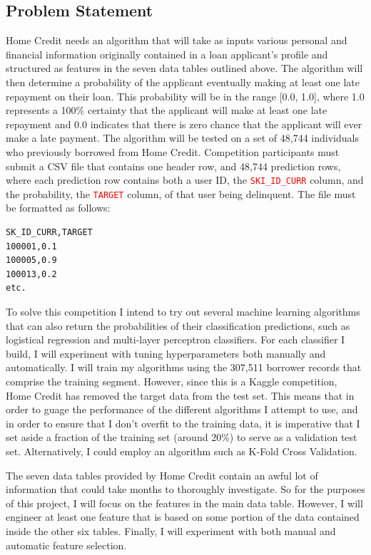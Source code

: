 \documentclass[12pt, letterpaper]{article}
\begin{document}
\subsection{Problem Statement}
Home Credit needs an algorithm that will take as inputs various personal and financial information originally contained in a loan applicant's profile and structured as features in the seven data tables outlined above. The algorithm will then determine a probability of the applicant eventually making at least one late repayment on their loan. This probability will be in the range [0.0, 1.0], where 1.0 represents a 100\% certainty that the applicant will make at least one late repayment and 0.0 indicates that there is zero chance that the applicant will ever make a late payment. The algorithm will be tested on a set of 48,744 individuals who previously borrowed from Home Credit. Competition participants must submit a CSV file that contains one header row, and 48,744 prediction rows, where each prediction row contains both a user ID, the \colorbox{backcolor}{\textcolor{red}{\texttt{SKI_ID_CURR}}} column, and the probability, the \colorbox{backcolor}{\textcolor{red}{\texttt{TARGET}}} column, of that user being delinquent. The file must be formatted as follows:

\begin{lstlisting}
SK_ID_CURR,TARGET
100001,0.1
100005,0.9
100013,0.2
etc.
\end{lstlisting}

To solve this competition I intend to try out several machine learning algorithms that can also return the probabilities of their classification predictions, such as logistical regression and multi-layer perceptron classifiers. For each classifier I build, I will experiment with tuning hyperparameters both manually and automatically. I will train my algorithms using the 307,511 borrower records that comprise the training segment. However, since this is a Kaggle competition, Home Credit has removed the target data from the test set. This means that in order to guage the performance of the different algorithms I attempt to use, and in order to ensure that I don't overfit to the training data, it is imperative that I set aside a fraction of the training set (around 20\%) to serve as a validation test set. Alternatively, I could employ an algorithm such as K-Fold Cross Validation.

The seven data tables provided by Home Credit contain an awful lot of information that could take months to thoroughly investigate. So for the purposes of this project, I will focus on the features in the main data table. However, I will engineer at least one feature that is based on some portion of the data contained inside the other six tables. Finally, I will experiment with both manual and automatic feature selection.
\end{document}
